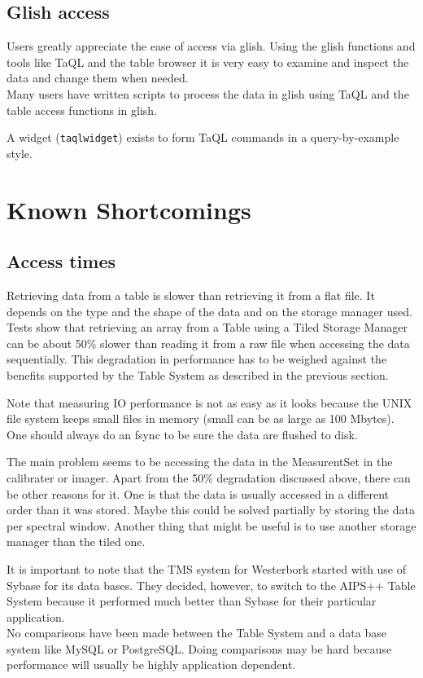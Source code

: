 \subsection{Glish access}
Users greatly appreciate the ease of access via glish. Using
the glish functions and tools like TaQL and the table browser it is
very easy to examine and inspect the data and change them when needed.
\\Many users have written scripts to process the data in glish using 
TaQL and the table access functions in glish.

A widget (\texttt{taqlwidget}) exists to form TaQL
commands in a query-by-example style.


\section{Known Shortcomings}

\subsection{Access times}
Retrieving data from a table is slower than retrieving it from a flat
file. It depends on the type and the shape of the data and on the
storage manager used. Tests show that retrieving an array from a Table
using a Tiled Storage Manager can be about 50\% slower than reading it
from a raw file when accessing the data sequentially.
This degradation in performance has to be weighed against the benefits
supported by the Table System as described in the previous section.

Note that measuring IO performance is not as easy as it looks because
the UNIX file system keeps small files in memory (small can be as
large as 100 Mbytes). One should always do an fsync to be sure the
data are flushed to disk.

The main problem seems to be accessing the data in the MeasurentSet
in the calibrater or imager. Apart from the 50\% degradation discussed
above, there can be other reasons for it. One is that the data
is usually accessed in a different order than it was stored.
Maybe this could be solved partially by storing the data per spectral
window. Another thing that might be useful is to use another storage
manager than the tiled one.

It is important to note that the TMS system for Westerbork started
with use of Sybase for its data bases. They decided, however, to
switch to the AIPS++ Table System because it performed much better
than Sybase for their particular application.
\\No comparisons have been made between the Table System and a
data base system like MySQL or PostgreSQL. Doing comparisons may be hard
because performance will usually be highly application dependent.

